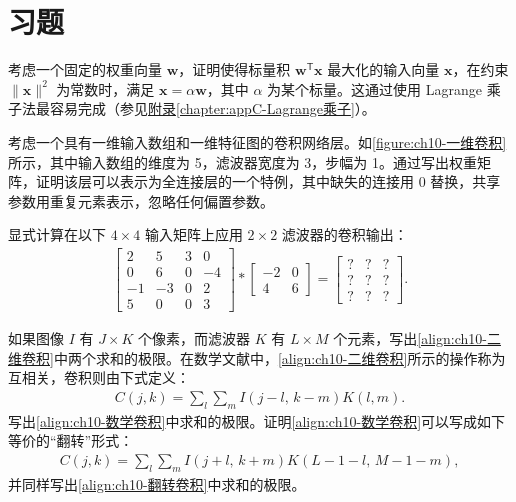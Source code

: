 \documentclass[../../main.tex]{subfiles}
\begin{document}
\section{习题}\label{section:ch10-习题}

\begin{exercise}[$\star$]\label{exercise:ch10-01}
考虑一个固定的权重向量 $\mathbf{w}$，证明使得标量积 $\mathbf{w}^{\mathsf{T}}\mathbf{x}$ 最大化的输入向量 $\mathbf{x}$，在约束 $\|\mathbf{x}\|^2$ 为常数时，满足 $\mathbf{x}=\alpha\mathbf{w}$，其中 $\alpha$ 为某个标量。这通过使用 Lagrange 乘子法最容易完成（参见\hyperref[chapter:appC-Lagrange乘子]{附录\ref*{chapter:appC-Lagrange乘子}}）。
\end{exercise}

\begin{exercise}[$\star\star$]\label{exercise:ch10-02}
考虑一个具有一维输入数组和一维特征图的卷积网络层。如\cref{figure:ch10-一维卷积}所示，其中输入数组的维度为 5，滤波器宽度为 3，步幅为 1。通过写出权重矩阵，证明该层可以表示为全连接层的一个特例，其中缺失的连接用 $0$ 替换，共享参数用重复元素表示，忽略任何偏置参数。
\end{exercise}

\begin{exercise}[$\star$]\label{exercise:ch10-03}
显式计算在以下 $4\times4$ 输入矩阵上应用 $2\times2$ 滤波器的卷积输出：
\begin{align}
  \begin{bmatrix} 2 & 5 & 3 & 0\\ 0 & 6 & 0 & -4\\ -1 & -3 & 0 & 2\\ 5 & 0 & 0 & 3 \end{bmatrix}
  *
  \begin{bmatrix} -2 & 0\\ 4 & 6 \end{bmatrix}
  =
  \begin{bmatrix} ? & ? & ?\\ ? & ? & ?\\ ? & ? & ? \end{bmatrix}.
  \label{align:ch10-习题卷积}
\end{align}
\end{exercise}

\begin{exercise}[$\star\star$]\label{exercise:ch10-04}
如果图像 $I$ 有 $J\times K$ 个像素，而滤波器 $K$ 有 $L\times M$ 个元素，写出\eqref{align:ch10-二维卷积}中两个求和的极限。在数学文献中，\eqref{align:ch10-二维卷积}所示的操作称为互相关，卷积则由下式定义：
\begin{align}
  C(j,k)=\sum_{l}\sum_{m}I(j-l,\,k-m)K(l,m).
  \label{align:ch10-数学卷积}
\end{align}
写出\eqref{align:ch10-数学卷积}中求和的极限。证明\eqref{align:ch10-数学卷积}可以写成如下等价的“翻转”形式：
\begin{align}
  C(j,k)=\sum_{l}\sum_{m}I(j+l,\,k+m)K(L-1-l,\,M-1-m),
  \label{align:ch10-翻转卷积}
\end{align}
并同样写出\eqref{align:ch10-翻转卷积}中求和的极限。
\end{exercise}
\end{document}
